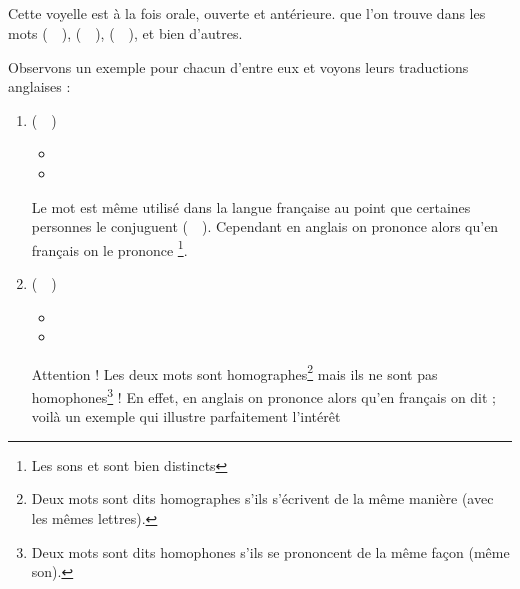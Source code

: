 \subsection{}\label{subsec:afr}

Cette voyelle est à la fois orale, ouverte et antérieure. 
que l'on trouve dans les mots  (~~),
 (~~),  (~~), et bien
d'autres. 

Observons un exemple pour chacun d'entre eux et voyons leurs
traductions anglaises :\par

\begin{enumerate}
\item {} (~~)
  \begin{itemize}
  \item {}
    \item {}
    \end{itemize}
    Le mot  est même utilisé dans la langue française
    au point que certaines personnes le conjuguent (~~).
    Cependant en anglais on
    prononce
    \href{https://en.oxforddictionaries.com/definition/stop}{}
    alors qu'en français on le prononce
    \href{http://www.wordreference.com/fren/stop}{}\footnote{Les
      sons  et  sont bien distincts}.
\item {} (~~)
  \begin{itemize}
  \item {}
  \item {}
  \end{itemize}
    Attention ! Les deux mots sont homographes\footnote{Deux mots sont
      dits homographes s'ils s'écrivent de la même manière (avec les
      mêmes lettres).} mais ils ne sont pas homophones\footnote{Deux
      mots sont dits homophones s'ils se prononcent de la même façon
      (même son).} ! En effet, en anglais on prononce
    \href{https://en.oxforddictionaries.com/definition/bar}{}
    alors qu'en français on dit \href{http://www.wordreference.com/fren/bar}{}; voilà un exemple qui illustre parfaitement l'intérêt

\end{enumerate}
